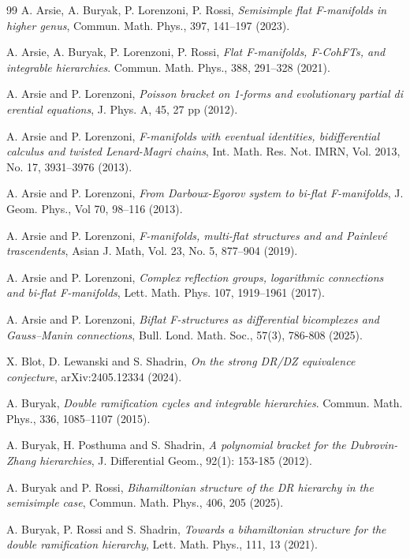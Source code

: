 \documentclass[11pt,a4paper]{amsart}
\numberwithin{equation}{section}
\numberwithin{equation}{section}
\begin{document}
\begin{thebibliography}{99}
 A. Arsie, A. Buryak, P. Lorenzoni, P. Rossi, \emph{Semisimple flat F-manifolds in higher genus}, Commun. Math. Phys., 397, 141--197 (2023).

 A. Arsie, A. Buryak, P. Lorenzoni, P. Rossi, {\it Flat F-manifolds, F-CohFTs, and integrable hierarchies}. Commun. Math. Phys., 388, 291--328 (2021).

A. Arsie and P. Lorenzoni, {\it Poisson bracket on 1-forms and evolutionary partial di erential equations}, J. Phys. A, 45, 27 pp (2012).

A. Arsie and P. Lorenzoni, \emph{F-manifolds with eventual identities, bidifferential calculus and twisted Lenard-Magri chains},
 Int. Math. Res. Not. IMRN, Vol. 2013, No. 17, 3931--3976 (2013).
 
A. Arsie and P. Lorenzoni, \emph{From Darboux-Egorov system to bi-flat F-manifolds}, J. Geom. Phys., Vol 70,  98--116 (2013). 

A. Arsie and P. Lorenzoni, \emph{F-manifolds, multi-flat structures and and Painlev\'e trascendents},  Asian J. Math, Vol. 23, No. 5, 877--904 (2019).

A. Arsie and P. Lorenzoni, \emph{Complex reflection groups, logarithmic connections and bi-flat F-manifolds}, Lett. Math. Phys. 107, 1919--1961 (2017). 

A. Arsie and P. Lorenzoni, \emph{Biflat F-structures as differential bicomplexes and Gauss–Manin connections}, Bull. Lond. Math. Soc., 57(3), 786-808 (2025).

X. Blot, D. Lewanski and S. Shadrin, \emph{On the strong DR/DZ equivalence conjecture}, arXiv:2405.12334 (2024).

A. Buryak, \emph{Double ramification cycles and integrable hierarchies}. Commun. Math. Phys., 336, 1085–1107 (2015).


A. Buryak, H. Posthuma and S. Shadrin,
\emph{A polynomial bracket for the Dubrovin-Zhang hierarchies},
J. Differential Geom., 92(1): 153-185 (2012).

A. Buryak and P. Rossi, \emph{Bihamiltonian structure of the DR hierarchy in the semisimple case}, Commun. Math. Phys., 406, 205 (2025).

A. Buryak, P. Rossi and S. Shadrin, \emph{Towards a bihamiltonian structure for the double ramification hierarchy}, Lett. Math. Phys., 111, 13 (2021).


\end{thebibliography}
\end{document}
